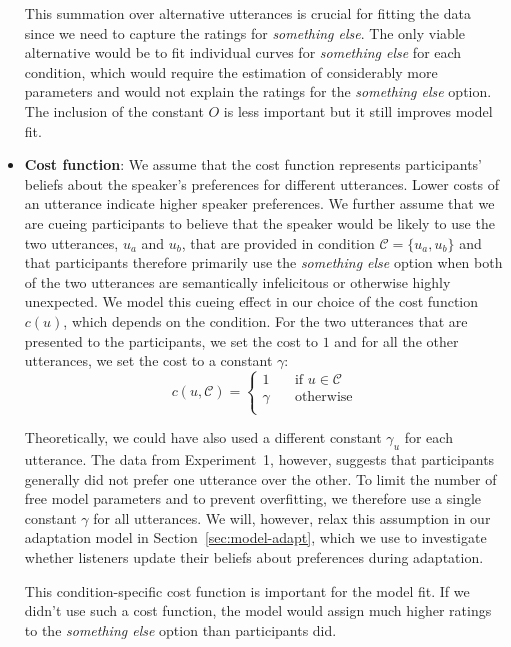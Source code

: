 \documentclass[man, floatsintext]{apa6}
\newcommand{\sectionref}[1]{Section~\ref{#1}}
\begin{document}
\begin{itemize}
This summation over alternative utterances is crucial for fitting the data since we need to
capture the ratings for \textit{something else}. The only viable alternative would be
to fit individual curves for \textit{something else} for each condition, which would require
the estimation of considerably more parameters and would not explain the ratings for the
\textit{something else} option. The inclusion of the constant $O$ is less important but it
still improves model fit.


\item \textbf{Cost function}: We assume that the cost function represents participants' beliefs about the speaker's 
preferences for different utterances. Lower costs of an utterance indicate higher speaker preferences. We further 
assume that we are cueing participants to believe that the speaker would be likely to use the two utterances, $u_a$ 
and $u_b$, that are provided in condition $\mathscr{C}=\{u_a, u_b\}$ and that participants therefore primarily use the 
\textit{something else} option when both of the two utterances are semantically infelicitous or otherwise highly unexpected. 
We model this cueing effect in our choice of the cost function $c(u)$, which depends on the condition. For the two utterances 
that are presented to the participants, we set the cost to $1$ and for all the other utterances, we set the cost to a constant $\gamma$:
$$
c(u, \mathscr{C}) = 
     \begin{cases}
       1 &\quad\text{if } u  \in \mathscr{C}\\
       \gamma &\quad\text{otherwise} \\
     \end{cases}
$$

Theoretically, we could have also used a different constant $\gamma_u$ for each utterance. The data from
Experiment~1, however, suggests that participants generally did not prefer one utterance over 
the other. To limit the number of free model parameters and to prevent overfitting, we therefore use a single
constant $\gamma$ for all utterances. We will, however, relax this assumption in our adaptation model in \sectionref{sec:model-adapt}, which
we use to investigate whether listeners update their beliefs about preferences during adaptation.

This condition-specific cost function is important for the model fit. If we didn't use such a cost function, 
the model would assign much higher ratings to the \textit{something else} option than participants did.


\end{itemize}
\end{document}
